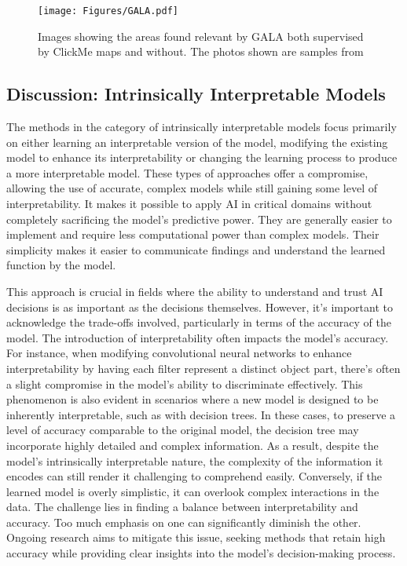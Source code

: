 \begin{figure}[ht!]
	\begin{center}
		\texttt{[image: Figures/GALA.pdf]}
	\end{center}
	\caption{Images showing the areas found relevant by GALA both supervised by ClickMe maps and without. The photos shown are samples from~\cite{LinsleySES19}}
	\label{Fig:GALA}
\end{figure} 

\subsection{Discussion: Intrinsically Interpretable Models}

The methods in the category of intrinsically interpretable models focus primarily on either learning an interpretable version of the model, modifying the existing model to enhance its interpretability or changing the learning process to produce a more interpretable model. These types of approaches offer a compromise, allowing the use of accurate, complex models while still gaining some level of interpretability. It makes it possible to apply AI in critical domains without completely sacrificing the model's predictive power. They are generally easier to implement and require less computational power than complex models. Their simplicity makes it easier to communicate findings and understand the learned function by the model.


This approach is crucial in fields where the ability to understand and trust AI decisions is as important as the decisions themselves. However, it's important to acknowledge the trade-offs involved, particularly in terms of the accuracy of the model. The introduction of interpretability often impacts the model's accuracy. For instance, when modifying convolutional neural networks to enhance interpretability by having each filter represent a distinct object part, there's often a slight compromise in the model's ability to discriminate effectively. This phenomenon is also evident in scenarios where a new model is designed to be inherently interpretable, such as with decision trees. In these cases, to preserve a level of accuracy comparable to the original model, the decision tree may incorporate highly detailed and complex information. As a result, despite the model's intrinsically interpretable nature, the complexity of the information it encodes can still render it challenging to comprehend easily. Conversely, if the learned model is overly simplistic, it can overlook complex interactions in the data. The challenge lies in finding a balance between interpretability and accuracy. Too much emphasis on one can significantly diminish the other. Ongoing research aims to mitigate this issue, seeking methods that retain high accuracy while providing clear insights into the model's decision-making process.

